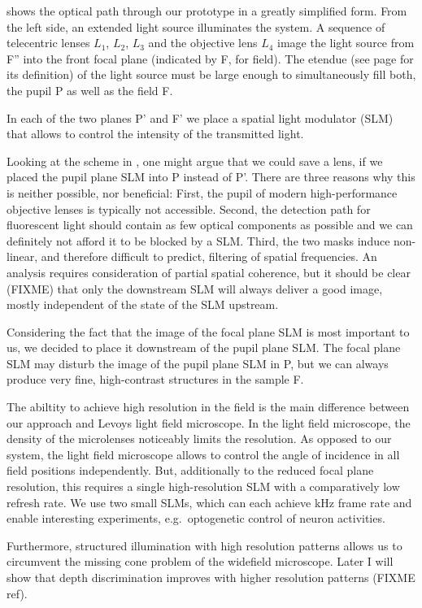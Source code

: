  shows the optical path through our prototype
in a greatly simplified form.  From the left side, an extended light
source illuminates the system. A sequence of telecentric lenses $L_1$,
$L_2$, $L_3$ and the objective lens $L_4$ image the light source from
F'' into the front focal plane (indicated by F, for field). The
etendue (see page \pageref{sec:etendue} for its definition) of the
light source must be large enough to simultaneously fill both, the
pupil P as well as the field F.

In each of the two planes P' and F' we place a spatial light modulator
(SLM) that allows to control the intensity of the transmitted light.

Looking at the scheme in , one might argue
that we could save a lens, if we placed the pupil plane SLM into P
instead of P'. There are three reasons why this is neither possible,
nor beneficial: First, the pupil of modern high-performance objective
lenses is typically not accessible. Second, the detection path for
fluorescent light should contain as few optical components as possible
and we can definitely not afford it to be blocked by a SLM.  Third,
the two masks induce non-linear, and therefore difficult to predict,
filtering of spatial frequencies. An analysis requires consideration
of partial spatial coherence, but it should be clear (FIXME) that only
the downstream SLM will always deliver a good image, mostly
independent of the state of the SLM upstream.

Considering the fact that the image of the focal plane SLM is most
important to us, we decided to place it downstream of the pupil plane
SLM. The focal plane SLM may disturb the image of the pupil plane SLM
in P, but we can always produce very fine, high-contrast structures in
the sample F.

The abiltity to achieve high resolution in the field is the main
difference between our approach and Levoys light field microscope.  In
the light field microscope, the density of the microlenses noticeably
limits the resolution. As opposed to our system, the light field
microscope allows to control the angle of incidence in all field
positions independently.  But, additionally to the reduced focal plane
resolution, this requires a single high-resolution SLM with a
comparatively low refresh rate. We use two small SLMs, which can each
achieve \unit[1]{kHz} frame rate and enable interesting experiments,
e.g.\ optogenetic control of neuron activities.

Furthermore, structured illumination with high resolution patterns
allows us to circumvent the missing cone problem of the widefield
microscope.  Later I will show that depth discrimination improves with
higher resolution patterns (FIXME ref).
